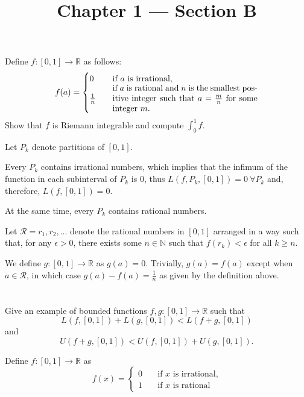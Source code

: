 \documentclass[11pt, a4paper, tikz]{article}
\newcommand{\centsection}[1]{
	\section*{\centering{#1}}
}
\newcommand{\Int}[2]{\displaystyle \int_{#1}^{#2}}
\newcommand{\naturals}{
	\ensuremath{\mathbb{N}}
}
\newcommand{\reals}{
	\ensuremath{\mathbb{R}}
}
\begin{document}
	\title{\textbf{Chapter 1 — Section B}}
	\maketitle
	\centsection{Exercise 1}
	
	\begin{formulationBox}
		Define $f:[0,1]\rightarrow\reals$ as follows:
		\[
			f(a) =
			\begin{cases}
				0 &\quad \textrm{if $a$ is irrational,}\\
				\frac{1}{n} &\quad \parbox{.5\linewidth}{if $a$ is rational and $n$ is the smallest positive integer such that $a=\frac{m}{n}$ for some integer $m$.}
			\end{cases}
		\]
		Show that $f$ is Riemann integrable and compute $\Int{0}{1}f$.
	\end{formulationBox}
	
	Let $P_k$ denote partitions of $[0,1]$.
	
	Every $P_k$ contains irrational numbers, which implies that the infimum of the function in each subinterval of $P_k$ is 0, thus $L(f, P_k, [0,1]) = 0\ \forall P_k$ and, therefore, $L(f, [0,1]) = 0$.
	
	At the same time, every $P_k$ contains rational numbers.
	
	Let $\mathcal{R} = r_1, r_2, \dots$ denote the rational numbers in $[0, 1]$ arranged in a way such that, for any $\epsilon>0$, there exists some $n\in\naturals$ such that $f(r_k)<\epsilon$ for all $k\geq n$.
	
	We define $g:[0,1]\rightarrow\reals$ as $g(a) = 0$. Trivially, $g(a)=f(a)$ except when $a\in\mathcal{R}$, in which case $g(a)-f(a) = \frac{1}{n}$ as given by the definition above.
	
	
	
	\centsection{Exercise 4}
	
	\begin{formulationBox}
		Give an example of bounded functions $f, g:[0,1]\rightarrow\reals$ such that \[L(f, [0,1]) + L(g, [0,1]) < L(f+g,[0,1])\] and \[U(f+g,[0,1]) < U(f, [0,1]) + U(g, [0,1]).\]
	\end{formulationBox}
	
	Define $f:[0,1]\rightarrow\reals$ as
	\[
		f(x) =
		\begin{cases}
			0 &\quad \textrm{if $x$ is irrational,}\\
			1 &\quad \textrm{if $x$ is rational}
		\end{cases}
	\]
	
\end{document}
